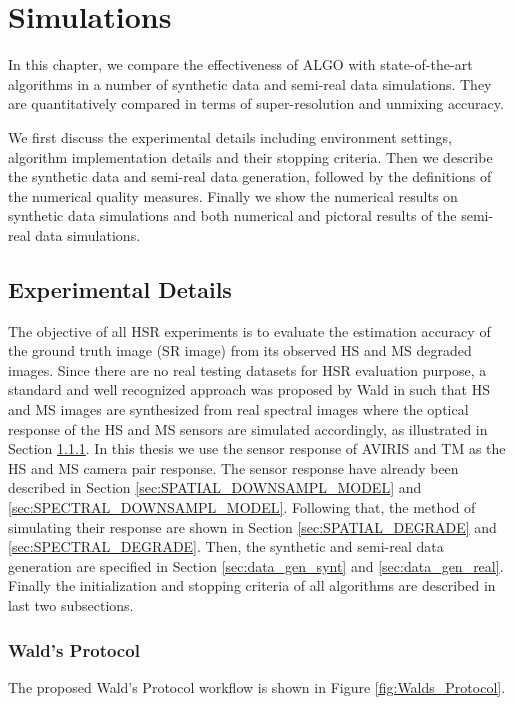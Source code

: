 \chapter{Simulations}
In this chapter, we compare the effectiveness of ALGO with state-of-the-art
algorithms in a number of synthetic data and semi-real data simulations.
They are quantitatively compared in terms of super-resolution and unmixing
accuracy.

We first discuss the experimental details including environment settings,
algorithm implementation details and their stopping criteria.
Then we describe the synthetic data and semi-real data generation, followed by
the definitions of the numerical quality measures.
Finally we show the numerical results on synthetic data simulations and both
numerical and pictoral results of the semi-real data simulations.

\section{Experimental Details} \label{sec:expt_details}
The objective of all HSR experiments is to evaluate the estimation accuracy of
the ground truth image (SR image) from its observed HS and MS degraded images.
Since there are no real testing datasets for HSR evaluation purpose, a
standard and well recognized approach was proposed by Wald \etal in
\cite{WALDS_PROTOCOL} such that HS and MS images are synthesized from real
spectral images where the optical response of the HS and MS sensors are
simulated accordingly, as illustrated in Section \ref{sec:walds_protocol}.
In this thesis we use the sensor response of AVIRIS and TM as the HS and MS
camera pair response.
The sensor response have already been described in Section
\ref{sec:SPATIAL_DOWNSAMPL_MODEL} and \ref{sec:SPECTRAL_DOWNSAMPL_MODEL}.
Following that, the method of simulating their response are shown in Section
\ref{sec:SPATIAL_DEGRADE} and \ref{sec:SPECTRAL_DEGRADE}.
Then, the synthetic and semi-real data generation are specified in Section
\ref{sec:data_gen_synt} and \ref{sec:data_gen_real}.
Finally the initialization and stopping criteria of all algorithms are
described in last two subsections.

\subsection{Wald's Protocol}\label{sec:walds_protocol}
The proposed Wald's Protocol workflow is shown in Figure
\ref{fig:Walds_Protocol}.

